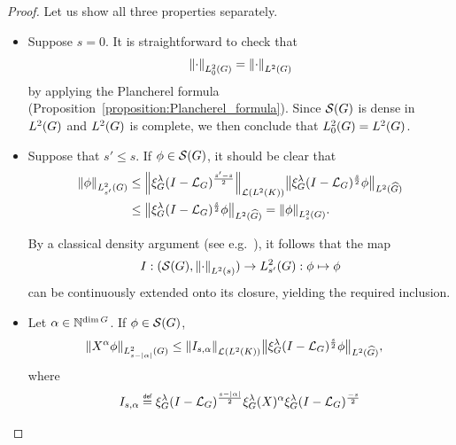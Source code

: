 \begin{proof}
    Let us show all three properties separately.
    \begin{itemize}
        \item
            Suppose $s = 0$.
            It is straightforward to check that
            \begin{align*}
                \norm [\Sobolev 0] \dummy = \norm [\Lebesgue 2 \Group] \dummy
            \end{align*}
            by applying the Plancherel formula (Proposition~\ref{proposition:Plancherel_formula}).
            Since $\Schwartz \Group$ is dense in $\Lebesgue 2 \Group$
            and $\Lebesgue 2 \Group$ is complete, %
            we then conclude that $\Sobolev 0 = \Lebesgue 2 \Group$.
        \item
            Suppose that $s' \leq s$.
            If $\phi \in \Schwartz \Group$,
            it should be clear that
            \begin{align*}
                \norm [\Sobolev {s'}] \phi
                &\leq \norm [\Lin {\Lebesgue 2 \CompactGroup}] {\Rep \lambda \BesselPotential {s' - s}} \norm [\LebesgueDual 2 \Group] {\Rep \lambda \BesselPotential s \phi}\\
                &\leq \norm [\LebesgueDual 2 \Group] {\Rep \lambda \BesselPotential s \phi} = \norm [\Sobolev s] \phi.
            \end{align*}

            By a classical density argument
            (see e.g.\ \cite[Proposition 3.2.3]{Willem2013}),
            it follows that the map
            \begin{align*}
                I : (\Schwartz \Group, \norm [\Lebesgue 2 s] {\dummy}) \to \Sobolev {s'} : \phi \mapsto \phi
            \end{align*}
            can be continuously extended onto its closure,
            yielding the required inclusion.
        \item
            Let $\alpha \in \N^{\dim \Group}$.
            If $\phi \in \Schwartz \Group$,
            \begin{align*}
                \norm [\Sobolev {s - \abs \alpha}] {\LeftDifferentialOperator \alpha \phi}
                &\leq \norm [\Lin {\Lebesgue 2 \CompactGroup}] {I_{s, \alpha}} \norm [\LebesgueDual 2 \Group] {\Rep \lambda \BesselPotential s \phi},
            \end{align*}
            where
            \begin{align*}
                I_{s, \alpha} \defeq \Rep \lambda \BesselPotential {s - \abs \alpha} \Rep \lambda (X)^\alpha \Rep \lambda \BesselPotential{-s}
            \end{align*}


\end{itemize}
\end{proof}
